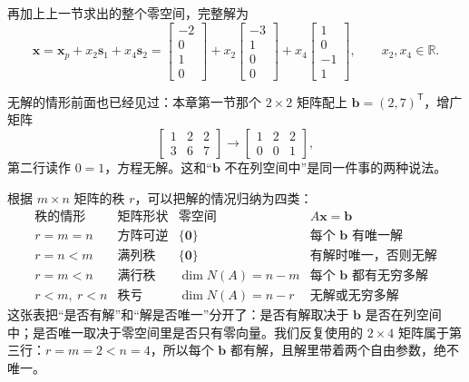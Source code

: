 \documentclass[UTF8,a4paper,12pt]{ctexart}
\numberwithin{equation}{section}
\newcommand{\R}{\mathbb{R}}
\newcommand{\trans}{^{\mathsf T}}
\begin{document}
	再加上上一节求出的整个零空间，完整解为
	\begin{equation}\label{eq:5.46}
	\bm{x}=\bm{x}_p+x_2\bm{s}_1+x_4\bm{s}_2
	=\begin{bmatrix}-2\\0\\1\\0\end{bmatrix}
	+x_2\begin{bmatrix}-3\\1\\0\\0\end{bmatrix}
	+x_4\begin{bmatrix}1\\0\\-1\\1\end{bmatrix},
	\qquad x_2,x_4\in\R.
	\end{equation}
	
	无解的情形前面也已经见过：本章第一节那个 $2\times2$ 矩阵配上 $\bm{b}=(2,7)\trans$，增广矩阵
	\begin{equation}\label{eq:5.47}
	\begin{bmatrix}
		1&2&2\\
		3&6&7
	\end{bmatrix}
	\longrightarrow
	\begin{bmatrix}
		1&2&2\\
		0&0&1
	\end{bmatrix},
	\end{equation}
	第二行读作 $0=1$，方程无解。这和“$\bm{b}$ 不在列空间中”是同一件事的两种说法。
	
	根据 $m\times n$ 矩阵的秩 $r$，可以把解的情况归纳为四类：
	\begin{equation}\label{eq:5.48}
	\begin{array}{c|c|c|c}
		\text{秩的情形} & \text{矩阵形状} & \text{零空间} & A\bm{x}=\bm{b}\\
		\hline
		r=m=n & \text{方阵可逆} & \{\bm{0}\} & \text{每个 }\bm{b}\text{ 有唯一解}\\
		r=n<m & \text{满列秩} & \{\bm{0}\} & \text{有解时唯一，否则无解}\\
		r=m<n & \text{满行秩} & \dim N(A)=n-m & \text{每个 }\bm{b}\text{ 都有无穷多解}\\
		r<m,\ r<n & \text{秩亏} & \dim N(A)=n-r & \text{无解或无穷多解}
	\end{array}
	\end{equation}
	这张表把“是否有解”和“解是否唯一”分开了：是否有解取决于 $\bm{b}$ 是否在列空间中；是否唯一取决于零空间里是否只有零向量。我们反复使用的 $2\times4$ 矩阵属于第三行：$r=m=2<n=4$，所以每个 $\bm{b}$ 都有解，且解里带着两个自由参数，绝不唯一。
	
\end{document}
